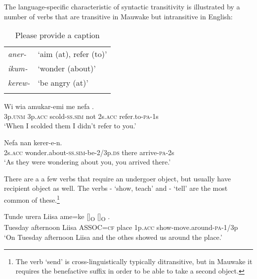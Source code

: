 The language-specific characteristic of syntactic transitivity \citep[49--51]{Kittila2002} is illustrated by a number of verbs that are transitive in Mauwake but intransitive in English:

\begin{table}
\caption{Please provide a caption}
\label{} 
\begin{tabular}{>{\itshape}ll}
\mytoprule
aner- &`aim (at), refer (to)'\\
ikum- &`wonder (about)'\\
kerew- &`be angry (at)'\\
\mybottomrule
\end{tabular}

\end{table}

\ea%
\label{ex:3:x302}
\gll Wi wia amukar-emi me nefa . \\
3p.\textsc{unm} 3p.\textsc{acc} scold-\textsc{ss}.\textsc{sim} not 2s.\textsc{acc} refer.to-\textsc{pa}-1s \\
\glt`When I scolded them I didn't refer to you.'
\z

\ea%
\label{ex:3:x303}
\gll Nefa  nan kerer-e-n. \\
2s.\textsc{acc} wonder.about-\textsc{ss}.\textsc{sim}-be-2/3p.\textsc{ds} there arrive-\textsc{pa}-2s\\
\glt`As they were wondering about you, you arrived there.'
\z

There are a a few verbs that require an undergoer object, but usually have recipient object as well. The verbs - `show, teach' and - `tell' are the most common of these.\footnote{The verb `send' is cross-linguistically typically ditransitive, but in Mauwake it requires the benefactive suffix in order to be able to take a second object.} 

\ea%
\label{ex:3:x1838}
\gll Tunde urera Liisa ame=ke []\textsubscript{O} []\textsubscript{O} \textstyleEmphasizedVernacularWords{-}\textstyleEmphasizedVernacularWords{-}.\\
Tuesday afternoon Liisa \textsc{ASSOC}=\textsc{cf} place 1p.\textsc{acc} show-move.around-\textsc{pa}-1/3p\\
\glt`On Tuesday afternoon Liisa and the othes showed us around the place.'
\z

